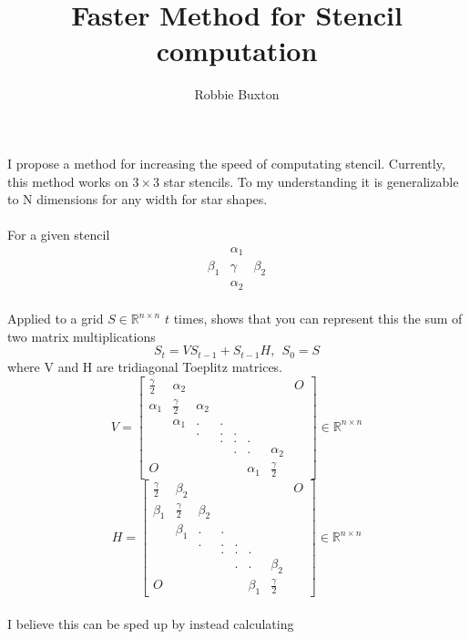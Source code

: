 \documentclass{article}
\begin{document}
\title{Faster Method for Stencil computation}
\author{Robbie Buxton}
\maketitle
I propose a method for increasing the speed of computating stencil. 
Currently, this method works on $3\times 3$ star stencils. To my understanding it is generalizable to N dimensions for any width for star shapes. \\ \\
For a given stencil
\newcommand{\stencilTop}{\alpha_{1}}
\newcommand{\stencilLeft}{\beta_{1}}
\newcommand{\stencilMiddle}{\gamma}
\newcommand{\stencilRight}{\beta_{2}}
\newcommand{\stencilBottom}{\alpha_{2}}
\[\begin{matrix} 
	& \stencilTop  & \\
	\stencilLeft  & \stencilMiddle  & \stencilRight  \\
	& \stencilBottom & 
\end{matrix}\] \\
\newcommand{\verticalBands}{V}
\newcommand{\horizontalBands}{H}
\newcommand{\sourceGrid}{S}
Applied to a grid $\sourceGrid \in \mathbb{R}^{n \times n}$ $t$ times,
\cite{10.1145/3524059.3532392} shows that you can represent this the sum of two matrix multiplications
\[ \sourceGrid_t = \verticalBands \sourceGrid_{t-1} + \sourceGrid_{t-1} \horizontalBands, \> \> S_0 = S\]
where V and H are tridiagonal Toeplitz matrices. 
\[ \verticalBands = 
\begin{bmatrix}
	\frac{\stencilMiddle}{2} & \stencilBottom & & & & & & O \\ 
	\stencilTop & \frac{\stencilMiddle}{2} & \stencilBottom & & & & & \\
	& \stencilTop & . & . & & & & \\
	& &  . & . & . & & &  \\
	& & & . & . & . & & \\
	& & & & . & .& \stencilBottom \\
	O & & & & &  \stencilTop & \frac{\stencilMiddle}{2}
\end{bmatrix} \in \mathbb{R}^{n\times n} \]
\[\horizontalBands = 
\begin{bmatrix}
	\frac{\stencilMiddle}{2} & \stencilRight & & & & & & O \\ 
	\stencilLeft & \frac{\stencilMiddle}{2} & \stencilRight & & & & & \\
	& \stencilLeft & . & . & & & & \\
	& &  . & . & . & & &  \\
	& & & . & . & . & & \\
	& & & & . & .& \stencilRight \\
	O & & & & &  \stencilLeft & \frac{\stencilMiddle}{2}
\end{bmatrix} \in \mathbb{R}^{n\times n}\] \\ 
I believe this can be sped up by instead calculating
\newcommand{\innerSum}{C}
\newcommand{\verticalBasis}{{X_V}}
\newcommand{\verticalEigens}{{\Lambda_V}}
\newcommand{\horizontalBasis}{{X_H}}
\newcommand{\horizontalEigens}{{\Lambda_H}}
\newcommand{\transformedSourceGrid}{T}
\end{document}

